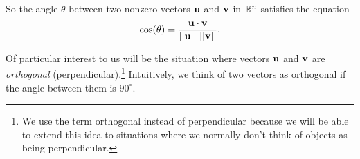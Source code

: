 So the angle $\theta$ between two nonzero vectors $\mathbf{u}$ and $\mathbf{v}$ in $\mathbb{R}^n$ satisfies the equation
\begin{equation} \label{eq:6_a_angle_between}\index{angle between vectors} 
\cos(\theta) = \frac{\vu \cdot \vv}{||\vu|| \ ||\vv||}.
\end{equation}

Of particular interest to us will be the situation where vectors $\mathbf{u}$ and $\mathbf{v}$ are \emph{orthogonal} (perpendicular).\footnote{We use the term orthogonal instead of perpendicular because we will be able to extend this idea to situations where we normally don't think of objects as being perpendicular.} Intuitively, we think of two vectors as orthogonal if the angle between them is $90^{\circ}$. 



